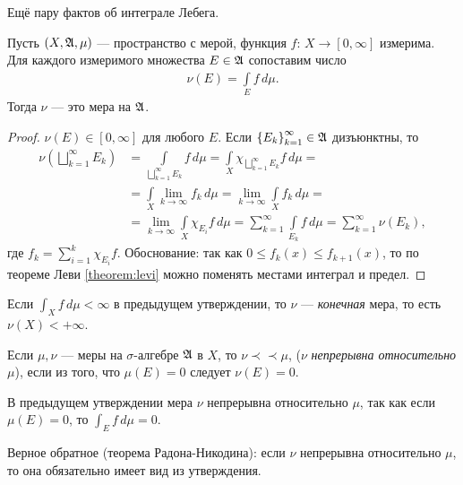 
Ещё пару фактов об интеграле Лебега.

\begin{claim}
 Пусть $(X, \mathfrak{A}, \mu)$ --- пространство с мерой, функция $f \colon\, X \to [0, \infty] $ измерима. Для каждого измеримого множества $E \in \mathfrak{A}$ сопоставим число \begin{align*}
  \nu(E) = \int\limits_{E} f \, d\mu 
 .\end{align*} Тогда $\nu$ --- это мера на $\mathfrak{A}$.
\end{claim}
\begin{proof}
 $\nu(E) \in [0, \infty]$ для любого $E$. Если $\left\{ E_k \right\}_{k=1}^{\infty} \in \mathfrak{A}$ дизъюнктны, то \begin{align*}
  \nu \left( \bigsqcup_{k=1}^{\infty} E_k   \right) &=  \int\limits_{\bigsqcup_{k=1}^{\infty} E_k } f \, d\mu = \int\limits_{X} \chi_{\bigsqcup_{k=1}^{\infty} E_k } f \, d\mu = \\
  &= \int\limits_{X} \lim_{k \to \infty} f_k  \, d\mu  = \lim_{k \to \infty} \int\limits_{X} f_k \, d\mu  = \\
  &= \lim_{k \to \infty} \int\limits_{X} \chi_{E_i} f \, d\mu   = \sum_{k=1}^{\infty} \int\limits_{E_k} f \, d\mu  = \sum_{k=1}^{\infty} \nu(E_k)
 ,\end{align*} где $f_k = \sum_{i=1}^{k} \chi_{E_i} f$. Обоснование: так как $0 \leqslant f_k(x) \leqslant f_{k+1}(x)$, то по теореме Леви \ref{theorem:levi} можно поменять местами интеграл и предел.
\end{proof}
\begin{remrk}
 Если $\int_{X} f \, d\mu < \infty$  в предыдущем утверждении, то $\nu$ --- \textit{конечная} мера, то есть $\nu(X) < +\infty$.
\end{remrk}
\begin{df}
 Если $\mu, \nu$ --- меры на $\sigma$-алгебре $\mathfrak{A}$ в $X$, то  $\nu \prec\prec \mu$, ($\nu$ \textit{непрерывна относительно} $\mu$), если из того, что $\mu(E) = 0$ следует $\nu(E) = 0$.
\end{df}
\begin{remrk}
 В предыдущем утверждении мера $\nu$ непрерывна относительно $\mu$, так как если $\mu(E) = 0$, то $\int_{E} f \, d\mu = 0$. 
\end{remrk}
\begin{remrk}
 Верное обратное (теорема Радона-Никодина): если $\nu$ непрерывна относительно $\mu$, то она обязательно имеет вид из утверждения.
\end{remrk}
